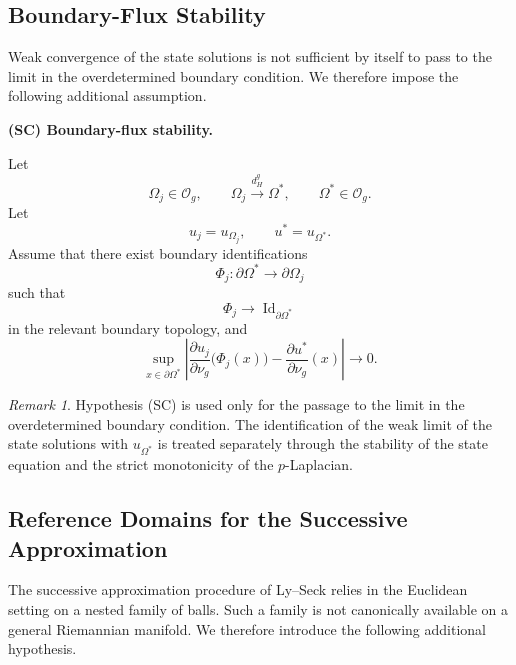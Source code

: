 \documentclass[11pt,a4paper]{article}
\theoremstyle{definition}
\theoremstyle{remark}
\newtheorem{remark}[theorem]{Remark}
\newcommand{\Og}{\mathcal{O}_g}
\begin{document}
\subsection{Boundary-Flux Stability}

Weak convergence of the state solutions is not sufficient by itself
to pass to the limit in the overdetermined boundary condition.
We therefore impose the following additional assumption.

\medskip
\noindent
\textbf{(SC) Boundary-flux stability.}

Let
\[
\Omega_j\in\Og,
\qquad
\Omega_j\xrightarrow{d_H^g}\Omega^\ast,
\qquad
\Omega^\ast\in\Og.
\]
Let
\[
u_j=u_{\Omega_j},
\qquad
u^\ast=u_{\Omega^\ast}.
\]
Assume that there exist boundary identifications
\[
\Phi_j:\partial\Omega^\ast\longrightarrow\partial\Omega_j
\]
such that
\[
\Phi_j\longrightarrow
\operatorname{Id}_{\partial\Omega^\ast}
\]
in the relevant boundary topology, and
\begin{equation}
\sup_{x\in\partial\Omega^\ast}
\left|
\frac{\partial u_j}{\partial\nu_g}
\bigl(\Phi_j(x)\bigr)
-
\frac{\partial u^\ast}{\partial\nu_g}(x)
\right|
\longrightarrow0.
\label{eq:SC}
\end{equation}

\begin{remark}
Hypothesis (SC) is used only for the passage to the limit in the
overdetermined boundary condition. The identification of the weak
limit of the state solutions with $u_{\Omega^\ast}$ is treated
separately through the stability of the state equation and the
strict monotonicity of the $p$-Laplacian.
\end{remark}


\subsection{Reference Domains for the Successive Approximation}

The successive approximation procedure of Ly--Seck relies in the
Euclidean setting on a nested family of balls. Such a family is not
canonically available on a general Riemannian manifold. We therefore
introduce the following additional hypothesis.
\end{document}
